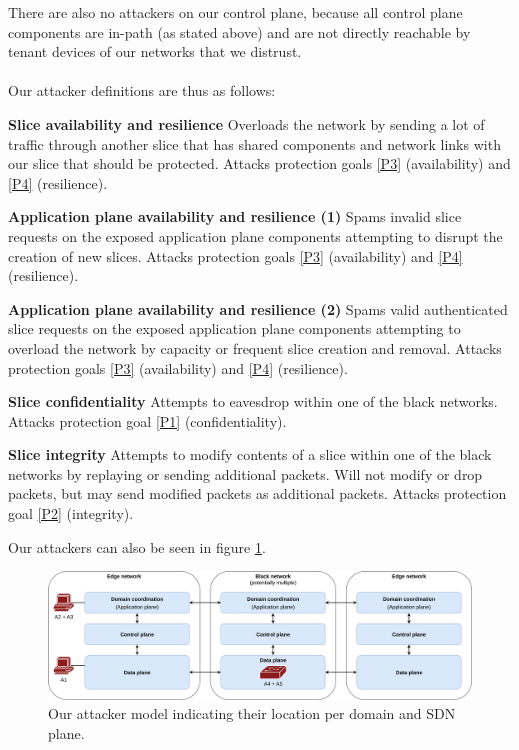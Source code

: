There are also no attackers on our control plane, because all control plane components are in-path (as stated above) and are not directly reachable by tenant devices of our networks that we distrust.

\paragraph{} Our attacker definitions are thus as follows:
\begin{description}[style=multiline, labelwidth=0.7cm]
    \item[\namedlabel{A1}{A1}] \textbf{Slice availability and resilience} Overloads the network by sending a lot of traffic through another slice that has shared components and network links with our slice that should be protected. Attacks protection goals \ref{P3} (availability) and \ref{P4} (resilience).
    \item[\namedlabel{A2}{A2}] \textbf{Application plane availability and resilience (1)} Spams invalid slice requests on the exposed application plane components attempting to disrupt the creation of new slices. Attacks protection goals \ref{P3} (availability) and \ref{P4} (resilience).
    \item[\namedlabel{A3}{A3}] \textbf{Application plane availability and resilience (2)} Spams valid authenticated slice requests on the exposed application plane components attempting to overload the network by capacity or frequent slice creation and removal. Attacks protection goals \ref{P3} (availability) and \ref{P4} (resilience).
    \item[\namedlabel{A4}{A4}] \textbf{Slice confidentiality} Attempts to eavesdrop within one of the black networks. Attacks protection goal \ref{P1} (confidentiality).
    \item[\namedlabel{A5}{A5}] \textbf{Slice integrity} Attempts to modify contents of a slice within one of the black networks by replaying or sending additional packets. Will not modify or drop packets, but may send modified packets as additional packets. Attacks protection goal \ref{P2} (integrity).
\end{description}

Our attackers can also be seen in figure \ref{fig:attacker_model}.

\begin{landscape}
\begin{figure}[h]
  \centering
  \includegraphics[width=\linewidth]{images/chapter_4/attacker_model.png}
  \caption[Attacker model]{Our attacker model indicating their location per domain and SDN plane.}
  \label{fig:attacker_model}
\end{figure}
\end{landscape}

